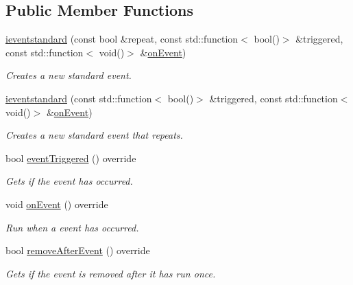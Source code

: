 \subsection*{Public Member Functions}
\begin{DoxyCompactItemize}
\item 
\hyperlink{classflounder_1_1ieventstandard_a23b490b9bd74fee4250b2bd628c369c7}{ieventstandard} (const bool \&repeat, const std\+::function$<$ bool()$>$ \&triggered, const std\+::function$<$ void()$>$ \&\hyperlink{classflounder_1_1ieventstandard_ac559905d5c7f4067ecc474742a1e24b8}{on\+Event})
\begin{DoxyCompactList}\small\item\em Creates a new standard event. \end{DoxyCompactList}\item 
\hyperlink{classflounder_1_1ieventstandard_a282f243c848a9520c64acebe9e94c232}{ieventstandard} (const std\+::function$<$ bool()$>$ \&triggered, const std\+::function$<$ void()$>$ \&\hyperlink{classflounder_1_1ieventstandard_ac559905d5c7f4067ecc474742a1e24b8}{on\+Event})
\begin{DoxyCompactList}\small\item\em Creates a new standard event that repeats. \end{DoxyCompactList}\item 
bool \hyperlink{classflounder_1_1ieventstandard_a7586cc333f29136b135f92685dc6f91b}{event\+Triggered} () override
\begin{DoxyCompactList}\small\item\em Gets if the event has occurred. \end{DoxyCompactList}\item 
void \hyperlink{classflounder_1_1ieventstandard_ac559905d5c7f4067ecc474742a1e24b8}{on\+Event} () override
\begin{DoxyCompactList}\small\item\em Run when a event has occurred. \end{DoxyCompactList}\item 
bool \hyperlink{classflounder_1_1ieventstandard_ac54c83ea92a634d2f389e712afda83fc}{remove\+After\+Event} () override
\begin{DoxyCompactList}\small\item\em Gets if the event is removed after it has run once. \end{DoxyCompactList}\end{DoxyCompactItemize}
